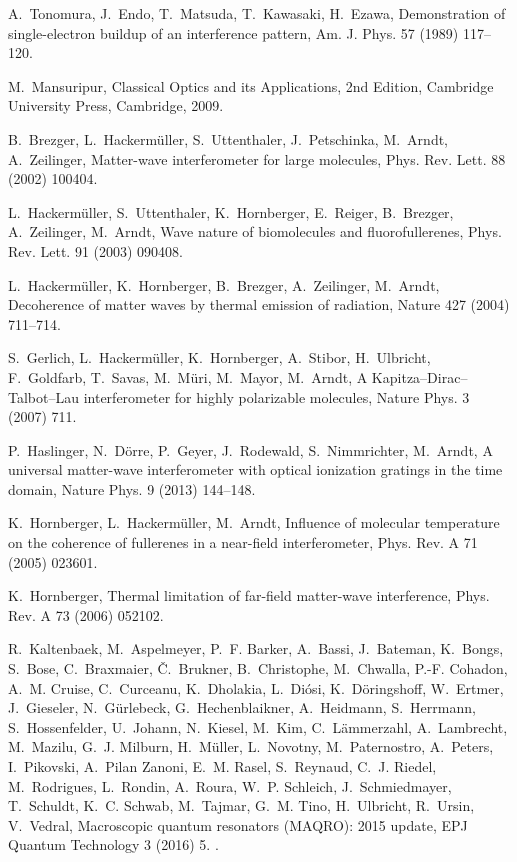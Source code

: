 \documentclass[3p,sort&compress,12pt]{elsarticle}
\begin{document}
\begin{thebibliography}{100}
A.~Tonomura, J.~Endo, T.~Matsuda, T.~Kawasaki, H.~Ezawa, Demonstration of
  single-electron buildup of an interference pattern, Am. J. Phys. 57 (1989)
  117--120.

M.~Mansuripur, Classical Optics and its Applications, 2nd Edition, Cambridge
  University Press, Cambridge, 2009.

B.~Brezger, L.~Hackerm{\"u}ller, S.~Uttenthaler, J.~Petschinka, M.~Arndt,
  A.~Zeilinger, Matter-wave interferometer for large molecules, Phys. Rev.
  Lett. 88 (2002) 100404.

L.~Hackerm{\"u}ller, S.~Uttenthaler, K.~Hornberger, E.~Reiger, B.~Brezger,
  A.~Zeilinger, M.~Arndt, Wave nature of biomolecules and fluorofullerenes,
  Phys. Rev. Lett. 91 (2003) 090408.

L.~Hackerm{\"u}ller, K.~Hornberger, B.~Brezger, A.~Zeilinger, M.~Arndt,
  Decoherence of matter waves by thermal emission of radiation, Nature 427
  (2004) 711--714.

S.~Gerlich, L.~Hackerm{\"u}ller, K.~Hornberger, A.~Stibor, H.~Ulbricht,
  F.~Goldfarb, T.~Savas, M.~M{\"u}ri, M.~Mayor, M.~Arndt, A
  {K}apitza--{D}irac--{T}albot--{L}au interferometer for highly polarizable
  molecules, Nature Phys. 3 (2007) 711.

P.~Haslinger, N.~D{\"o}rre, P.~Geyer, J.~Rodewald, S.~Nimmrichter, M.~Arndt, A
  universal matter-wave interferometer with optical ionization gratings in the
  time domain, Nature Phys. 9 (2013) 144--148.

K.~Hornberger, L.~Hackerm{\"u}ller, M.~Arndt, Influence of molecular
  temperature on the coherence of fullerenes in a near-field interferometer,
  Phys. Rev. A 71 (2005) 023601.

K.~Hornberger, Thermal limitation of far-field matter-wave interference, Phys.
  Rev. A 73 (2006) 052102.

R.~Kaltenbaek, M.~Aspelmeyer, P.~F. Barker, A.~Bassi, J.~Bateman, K.~Bongs,
  S.~Bose, C.~Braxmaier, {\v{C}}.~Brukner, B.~Christophe, M.~Chwalla, P.-F.
  Cohadon, A.~M. Cruise, C.~Curceanu, K.~Dholakia, L.~Di{\'o}si,
  K.~D{\"o}ringshoff, W.~Ertmer, J.~Gieseler, N.~G{\"u}rlebeck,
  G.~Hechenblaikner, A.~Heidmann, S.~Herrmann, S.~Hossenfelder, U.~Johann,
  N.~Kiesel, M.~Kim, C.~L{\"a}mmerzahl, A.~Lambrecht, M.~Mazilu, G.~J. Milburn,
  H.~M{\"u}ller, L.~Novotny, M.~Paternostro, A.~Peters, I.~Pikovski, A.~{Pilan
  Zanoni}, E.~M. Rasel, S.~Reynaud, C.~J. Riedel, M.~Rodrigues, L.~Rondin,
  A.~Roura, W.~P. Schleich, J.~Schmiedmayer, T.~Schuldt, K.~C. Schwab,
  M.~Tajmar, G.~M. Tino, H.~Ulbricht, R.~Ursin, V.~Vedral, Macroscopic quantum
  resonators ({MAQRO}): 2015 update, EPJ Quantum Technology 3 (2016) 5.
\newblock \href {http://dx.doi.org/10.1140/epjqt/s40507-016-0043-7}
  {}.


\end{thebibliography}
\end{document}
